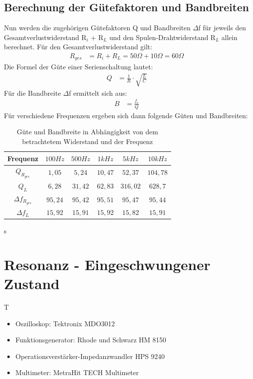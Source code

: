\documentclass{article}
\begin{document}
\subsection{Berechnung der Gütefaktoren und Bandbreiten}
Nun werden die zugehörigen Gütefaktoren Q und Bandbreiten $\Delta$f für jeweils den Gesamtverlustwiderstand R$_i$ + R$_L$ und den Spulen-Drahtwiderstand R$_L$ allein berechnet.
Für den Gesamtverlustwiderstand gilt:
\begin{align*}
  R_{ges} & = R_i + R_L= 50\Omega + 10\Omega = 60\Omega
\end{align*}
Die Formel der Güte einer Serienschaltung lautet:
\begin{align*}
  Q & = \frac{1}{R}\cdot\sqrt{\frac{L}{C}}
\end{align*}
Für die Bandbreite $\Delta$f ermittelt sich aus:
\begin{align*}
  B & = \frac{f_r}{Q}
\end{align*}
Für verschiedene Frequenzen ergeben sich dann folgende Güten und Bandbreiten:
\begin{table}[h]

  \begin{center}

    \begin{tabular}{|c|c|c|c|c|c|}
      \hline
      Frequenz             & $100Hz$ & $500Hz$ & $1kHz$  & $5kHz$   & $10kHz$  \\
      \hline
      $Q_{R_{ges}}$        & $1,05$  & $5,24$  & $10,47$ & $52,37$  & $104,78$ \\
      \hline
      $Q_L$                & $6,28$  & $31,42$ & $62,83$ & $316,02$ & $628,7$  \\
      \hline
      $\Delta f_{R_{ges}}$ & $95,24$ & $95,42$ & $95,51$ & $95,47$  & $95,44$  \\
      \hline
      $\Delta f_L$         & $15,92$ & $15,91$ & $15,92$ & $15,82$  & $15,91$  \\
      \hline
    \end{tabular}
    \caption{Güte und Bandbreite in Abhängigkeit von dem betrachtetem Widerstand und der Frequenz}
    \label{tab:cGB}
  \end{center}
\end{table}
s



\newpage

\section{Resonanz - Eingeschwungener Zustand}
\begin{devlist}
  T
  \begin{itemize}
    \item Oszilloskop: Tektronix MDO3012
    \item Funktionsgenerator: Rhode und Schwarz HM 8150
    \item Operationsverstärker-Impedanzwandler HPS 9240
    \item Multimeter: MetraHit TECH Multimeter
  \end{itemize}
\end{devlist}
\end{document}
